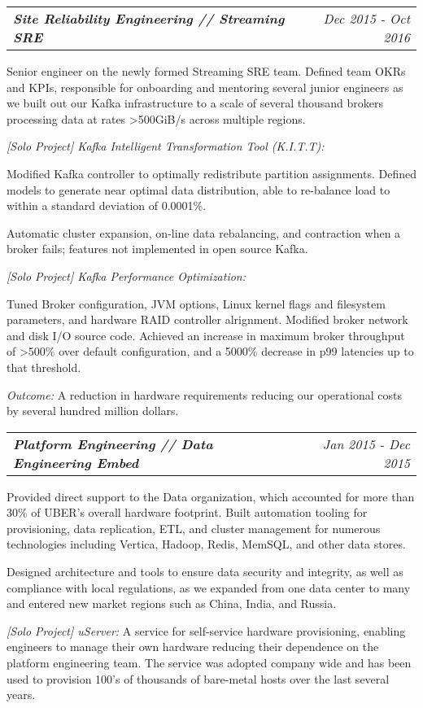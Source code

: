 \documentclass[10pt,letterpaper]{article}
\makeatletter
\newcommand{\area}[2]{\emph{#1:}   #2}
\newcommand{\subemployment}[3]{
	\headerrow
  {\hspace{8pt}\textbf{\emph{#1}}}
		{\emph{#2}}
  \vspace*{-15pt}
\begin{itemize*}
\item #3 
\end{itemize*}
}
\newcommand{\headerrow}[2]
{\begin{tabular*}{\linewidth}{l@{\extracolsep{\fill}}r}
	#1 &
	#2 \\
\end{tabular*}}
\makeatother
\begin{document}
{\subemployment
{Site Reliability Engineering // Streaming SRE}{Dec 2015 - Oct 2016}{
Senior engineer on the newly formed Streaming SRE team. Defined team OKRs and
KPIs, responsible for onboarding and mentoring several junior engineers as we
built out our Kafka infrastructure to a scale of several thousand brokers processing data
at rates >500GiB/s across multiple regions.
\item \area{[Solo Project] Kafka Intelligent Transformation Tool (K.I.T.T)}{
    \vspace*{-5pt}
    \begin{itemize*}
    \item Modified Kafka controller to optimally redistribute partition
      assignments. Defined models to generate near optimal data distribution,
      able to re-balance load to within a standard deviation of 0.0001\%.
    \item Automatic cluster expansion, on-line data rebalancing, and contraction
      when a broker fails; features not implemented in open source Kafka.
    \end{itemize*}
    \vspace*{-5pt}
    }
\item \area{[Solo Project] Kafka Performance Optimization}{
    \vspace*{-5pt}
    \begin{itemize*}
    \item Tuned Broker configuration, JVM options, Linux kernel flags and
      filesystem parameters, and hardware RAID controller alrignment. Modified
      broker network and disk I/O source code. Achieved an increase in maximum
      broker throughput of >500\% over default configuration, and a 5000\%
      decrease in p99 latencies up to that threshold.
    \item \emph{Outcome:} A reduction in hardware requirements reducing our operational costs by several hundred million dollars.
    \end{itemize*}
    \vspace*{-5pt}
    }
}

\subemployment
  {Platform Engineering // Data Engineering Embed}
  {Jan 2015 - Dec 2015}{
Provided direct support to the Data organization, which accounted for more than
30\% of UBER's overall hardware footprint. Built automation tooling for
provisioning, data replication, ETL, and cluster management for numerous
technologies including Vertica, Hadoop, Redis, MemSQL, and other data stores.
\item Designed architecture and tools to ensure data security and integrity, as well as
  compliance with local regulations, as we expanded from one data center to
  many and entered new market regions such as China, India, and Russia.
\item \area{[Solo Project] uServer} A service for self-service hardware
  provisioning, enabling engineers to manage their own hardware reducing their
  dependence on the platform engineering team. The service was  adopted company
  wide and has been used to provision 100’s of thousands of bare-metal hosts
  over the last several years.
}
}
\end{document}
